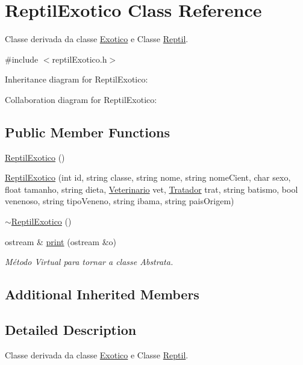 \hypertarget{classReptilExotico}{}\section{Reptil\+Exotico Class Reference}
\label{classReptilExotico}


Classe derivada da classe \hyperlink{classExotico}{Exotico} e Classe \hyperlink{classReptil}{Reptil}.  




{\ttfamily \#include $<$reptil\+Exotico.\+h$>$}



Inheritance diagram for Reptil\+Exotico\+:


Collaboration diagram for Reptil\+Exotico\+:
\subsection*{Public Member Functions}
\begin{DoxyCompactItemize}
\item 
\hyperlink{classReptilExotico_a0f9104f7cbed74d52a6711c03cd75003}{Reptil\+Exotico} ()
\item 
\hyperlink{classReptilExotico_af34ba2db9bf88361072a6937786f0d25}{Reptil\+Exotico} (int id, string classe, string nome, string nome\+Cient, char sexo, float tamanho, string dieta, \hyperlink{classVeterinario}{Veterinario} vet, \hyperlink{classTratador}{Tratador} trat, string batismo, bool venenoso, string tipo\+Veneno, string ibama, string pais\+Origem)
\item 
\hyperlink{classReptilExotico_abddaff7d11fd31ce5fcd4a2c1b4ee6f1}{$\sim$\+Reptil\+Exotico} ()
\item 
ostream \& \hyperlink{classReptilExotico_a24e184c97d40c3e9eec065a156db3703}{print} (ostream \&o)
\begin{DoxyCompactList}\small\item\em Método Virtual para tornar a classe Abstrata. \end{DoxyCompactList}\end{DoxyCompactItemize}
\subsection*{Additional Inherited Members}


\subsection{Detailed Description}
Classe derivada da classe \hyperlink{classExotico}{Exotico} e Classe \hyperlink{classReptil}{Reptil}. 

